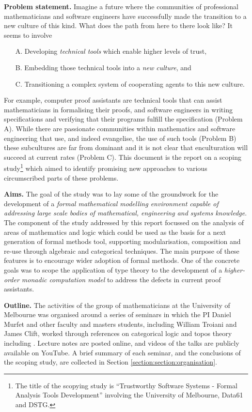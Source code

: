 \documentclass[english,letter paper,12pt,reqno]{article}
\theoremstyle{example}
\begin{document}
\textbf{Problem statement.} Imagine a future where the communities of professional mathematicians and software engineers have successfully made the transition to a new culture of this kind. What does the path from here to there look like? It seems to involve
\begin{itemize}
\item[A.] Developing \emph{technical tools} which enable higher levels of trust,
\item[B.] Embedding those technical tools into a \emph{new culture}, and
\item[C.] Transitioning a complex system of cooperating agents to this new culture.
\end{itemize}
For example, computer proof assistants are technical tools that can assist mathematicians in formalising their proofs, and software engineers in writing specifications and verifying that their programs fulfill the specification (Problem A). While there are passionate communities within mathematics and software engineering that use, and indeed evangelise, the use of such tools (Problem B) these subcultures are far from dominant and it is not clear that enculturation will succeed at current rates (Problem C). This document is the report on a scoping study\footnote{The title of the scopying study is ``Trustworthy Software Systems - Formal Analysis Tools Development'' involving the University of Melbourne, Data61 and DSTG.} which aimed to identify promising new approaches to various circumscribed parts of these problems.
\vspace{0.2cm}

\textbf{Aims.} The goal of the study was to lay some of the groundwork for the development of a \emph{formal mathematical modelling environment capable of addressing large scale bodies of mathematical, engineering and systems knowledge}. The component of the study addressed by this report focussed on the analysis of areas of mathematics and logic which could be used as the basis for a next generation of formal methods tool, supporting modularisation, composition and re-use through algebraic and categorical techniques. The main purpose of these features is to encourage wider adoption of formal methods. One of the concrete goals was to scope the application of type theory to the development of a \emph{higher-order monadic computation model} to address the defects in current proof assistants.
\vspace{0.2cm}

\textbf{Outline.} The activities of the group of mathematicians at the University of Melbourne was organised around a series of seminars \cite{risingseminar} in which the PI Daniel Murfet and other faculty and masters students, including William Troiani and James Clift, worked through references on categorical logic and topos theory including \cite{lambekscott,topos,johnstone}. Lecture notes are posted online, and videos of the talks are publicly available on YouTube. A brief summary of each seminar, and the conclusions of the scoping study, are collected in Section \ref{section:section:organisation}. 
\end{document}
